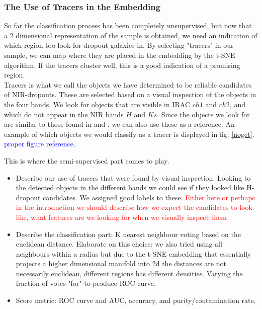 \subsubsection{The Use of Tracers in the Embedding}
So far the classification process has been completely unsupervised, but now that a 2 dimensional representation of the sample is obtained, we need an indication of which region too look for dropout galaxies in. By selecting "tracers" in our sample, we can map where they are placed in the embedding by the t-SNE algorithm. If the tracers cluster well, this is a good indication of a promising region. \\

Tracers is what we call the objects we have determined to be reliable candidates of NIR-dropouts. These are selected based on a visual inspection of the objects in the four bands. We look for objects that are visible in IRAC $ch1$ and $ch2$, and which do not appear in the NIR bands $H$ and $Ks$. Since the objects we look for are similar to those found in \cite{Wang_2019} and \cite{Alcalde_Pampliega_2019}, we can also use these as a reference. An example of which objects we would classify as a tracer is displayed in fig. \ref{noget}. \textcolor{blue}{proper figure reference}.


This is where the semi-supervised part comes to play.



\begin{itemize}
    \item Describe our use of tracers that were found by visual inspection. Looking to the detected objects in the different bands we could see if they looked like H-dropout candidates. We assigned good labels to these. \textcolor{red}{Either here or perhaps in the introduction we should describe how we expect the candidates to look like, what features are we looking for when we visually inspect them}
    \item Describe the classification part: K nearest neighbour voting based on the euclidean distance. Elaborate on this choice: we also tried using all neighbours within a radius but due to the t-SNE embedding that essentially projects a higher dimensional manifold into 2d the distances are not necessarily euclidean, different regions has different densities. Varying the fraction of votes "for" to produce ROC curve.
    \item Score metric: ROC curve and AUC, accuracy, and purity/contamination rate.
\end{itemize}